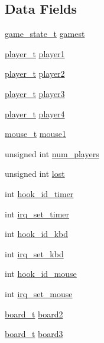 \subsection*{Data Fields}
\begin{DoxyCompactItemize}
\item 
\hyperlink{group___game_ga4edce1ca040716922b6e4a79be4e414d}{game\+\_\+state\+\_\+t} \hyperlink{group___game_gab76fa1d9cbf41273b5a8f7364a9f6f84}{gamest}
\item 
\hyperlink{structplayer__t}{player\+\_\+t} \hyperlink{group___game_ga127cf5952bea43dc134fa5d96bbc0609}{player1}
\item 
\hyperlink{structplayer__t}{player\+\_\+t} \hyperlink{group___game_gaf7e237b4f038b8d3e0deea44ab5d4eff}{player2}
\item 
\hyperlink{structplayer__t}{player\+\_\+t} \hyperlink{group___game_ga92766fdefc43e6eb53ca2792e05fcf51}{player3}
\item 
\hyperlink{structplayer__t}{player\+\_\+t} \hyperlink{group___game_ga11e7b96bbf74ee5e4a0623107518f66f}{player4}
\item 
\hyperlink{structmouse__t}{mouse\+\_\+t} \hyperlink{group___game_gab268f26e6ad9b1b9663004f9f0ea9cd4}{mouse1}
\item 
unsigned int \hyperlink{group___game_ga55cccbeadadd87a8367184083a39377a}{num\+\_\+players}
\item 
unsigned int \hyperlink{group___game_ga6325f05cd0c308b41c677ec0709707a4}{lost}
\item 
int \hyperlink{group___game_ga7f3d11d35385878045b6b6a2ec438ba8}{hook\+\_\+id\+\_\+timer}
\item 
int \hyperlink{group___game_gaadbf3757def1a49b68caa15ef9117b0f}{irq\+\_\+set\+\_\+timer}
\item 
int \hyperlink{group___game_ga7d15e4ad49d56102e73bfb92c6e43a22}{hook\+\_\+id\+\_\+kbd}
\item 
int \hyperlink{group___game_ga492428101cf654ca73d0b290d6dc7dfc}{irq\+\_\+set\+\_\+kbd}
\item 
int \hyperlink{group___game_ga0b0da21bbdff62b7b28e9af7ec3d0d76}{hook\+\_\+id\+\_\+mouse}
\item 
int \hyperlink{group___game_gafd357e4e90c5ce77865791f8e690db27}{irq\+\_\+set\+\_\+mouse}
\item 
\hyperlink{structboard__t}{board\+\_\+t} \hyperlink{group___game_gad024627d28eb323a7677e5a265535816}{board2}
\item 
\hyperlink{structboard__t}{board\+\_\+t} \hyperlink{group___game_gae6800e5869326de6be9d0be65d58b373}{board3}

\end{DoxyCompactItemize}
